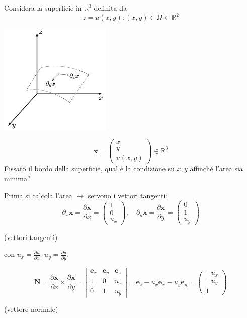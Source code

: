 \documentclass[a4paper,11pt]{report}
\newcommand{\vect}[1]{\boldsymbol{#1}}
\newcommand{\R}{\mathbb{R}}
\newcommand{\x}{\boldsymbol{x}}
\begin{document}
Considera la superficie in $\R^3$ definita da
\[
z=u(x,y) : (x,y) \in \Omega \subset \R^2
\]
\begin{center}
\includegraphics[width=0.4\textwidth]{immagini/superficie}
\end{center}
\[
\x = \left( \begin{matrix}
x\\
y\\
u(x,y)
\end{matrix}\right) \in \R^3
\]
Fissato il bordo della superficie, qual \`e la condizione su $x,y$ affinch\'e l'area sia minima?

Prima si calcola l'area $\rightarrow$ servono i vettori tangenti:
\[
\partial_x \x = \frac{\partial \x}{\partial x} =\left( \begin{matrix}
1\\
0\\
u_x
\end{matrix}\right) ,\quad 
\partial_y \x = \frac{\partial \x}{\partial y} =\left( \begin{matrix}
0\\
1\\
u_y
\end{matrix}\right)
\]
\centerline{(vettori tangenti)}
con $u_x=\frac{\partial u}{\partial x}$, $u_y=\frac{\partial u}{\partial y}$.

\[
\vect{N}=\frac{\partial \x}{\partial x} \times \frac{\partial \x}{\partial y}=\left| \begin{matrix}
\vect{e}_x & \vect{e}_y & \vect{e}_z \\
1 & 0 & u_x \\
0 & 1 & u_y
\end{matrix}\right| = \vect{e}_z-u_x \vect{e}_x - u_y \vect{e}_y = \left( \begin{matrix}
-u_x \\
-u_y \\
1
\end{matrix}\right)
\]
\centerline{(vettore normale)}
\end{document}

